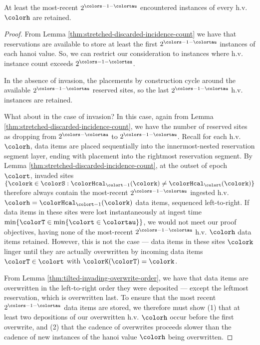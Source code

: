 \begin{lemma}
\label{thm:tilted-most-recent-retained}
At least the most-recent $2^{\colors - 1 - \colortau}$ encountered instances of every h.v. $\colorh$ are retained.
\end{lemma}
\begin{proof}
From Lemma \ref{thm:stretched-discarded-incidence-count} we have that reservations are available to store at least the first $2^{\colors - 1 - \colortau}$ instances of each hanoi value.
So, we can restrict our consideration to instances where h.v. instance count exceeds $2^{\colors - 1 - \colortau}$.

In the absence of invasion, the placements by construction cycle around the available $2^{\colors - 1 - \colortau}$ reserved sites, so the last $2^{\colors - 1 - \colortau}$ h.v. instances are retained.

What about in the case of invasion?
In this case, again from Lemma \ref{thm:stretched-discarded-incidence-count}, we have the number of reserved sites as dropping from $2^{\colors - \colortau}$ to $2^{\colors - 1 - \colortau}$.
Recall for each h.v. $\colorh$, data items are placed sequentially into the innermost-nested reservation segment layer, ending with placement into the rightmost reservation segment.
By Lemma \ref{thm:stretched-discarded-incidence-count}, at the outset of epoch $\colort$, invaded sites $\{\colork \in \colorS : \colorHcal_{\colort - 1}(\colork) \neq \colorHcal_{\colort}(\colork)\}$ therefore always contain the most-recent $2^{\colors - 1 - \colortau}$ ingested h.v. $\colorh = \colorHcal_{\colort - 1}(\colork)$ data items, sequenced left-to-right.
If data items in these sites were lost instantaneously at ingest time $\min\{\colorT \in \min\{\colort \in \colortau\}\}$, we would not meet our proof objectives, having none of the most-recent $2^{\colors - 1 - \colortau}$ h.v. $\colorh$ data items retained.
However, this is not the case --- data items in these sites $\colork$ linger until they are actually overwritten by incoming data items $\colorT \in \colort$ with $\colorK(\colorT) = \colork$.

From Lemma \ref{thm:tilted-invading-overwrite-order}, we have that data items are overwritten in the left-to-right order they were deposited --- except the leftmost reservation, which is overwritten last.
To ensure that the most recent $2^{\colors - 1 - \colortau}$ data items are stored, we therefore must show (1) that at least two depositions of our overwritten h.v. $\colorh$ occur before the first overwrite, and (2) that the cadence of overwrites proceeds slower than the cadence of new instances of the hanoi value $\colorh$ being overwritten.


\end{proof}
